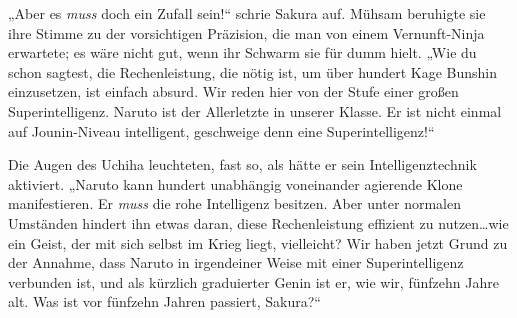 „Aber es \emph{muss} doch ein Zufall sein!“ schrie Sakura auf. Mühsam beruhigte sie ihre Stimme zu der vorsichtigen Präzision, die man von einem Vernunft-Ninja erwartete; es wäre nicht gut, wenn ihr Schwarm sie für dumm hielt.
„Wie du schon sagtest, die Rechenleistung, die nötig ist, um über hundert Kage Bunshin einzusetzen, ist einfach absurd. Wir reden hier von der Stufe einer großen Superintelligenz. Naruto ist der Allerletzte in unserer Klasse. Er ist nicht einmal auf Jounin-Niveau intelligent, geschweige denn eine Superintelligenz!“

Die Augen des Uchiha leuchteten, fast so, als hätte er sein Intelligenztechnik aktiviert.
„Naruto kann hundert unabhängig voneinander agierende Klone manifestieren. Er \emph{muss} die rohe Intelligenz besitzen. Aber unter normalen Umständen hindert ihn etwas daran, diese Rechenleistung effizient zu nutzen…wie ein Geist, der mit sich selbst im Krieg liegt, vielleicht? Wir haben jetzt Grund zu der Annahme, dass Naruto in irgendeiner Weise mit einer Superintelligenz verbunden ist, und als kürzlich graduierter Genin ist er, wie wir, fünfzehn Jahre alt. Was ist vor fünfzehn Jahren passiert, Sakura?“

